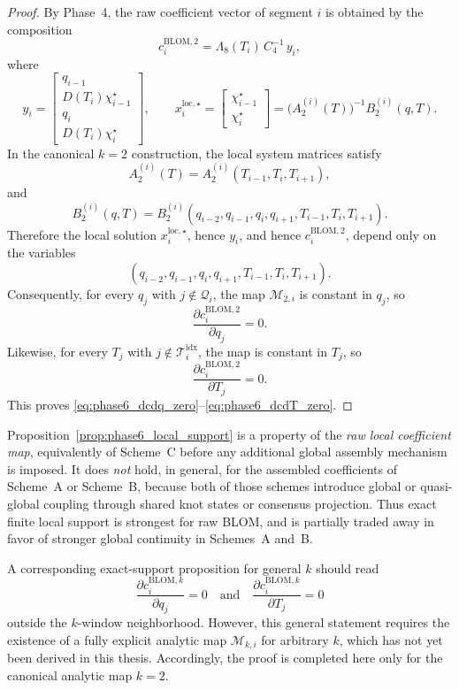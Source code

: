 \begin{proof}
By Phase~4, the raw coefficient vector of segment \(i\) is obtained by the composition
\[
c_i^{\mathrm{BLOM},2}
=
\Lambda_8(T_i)\,C_4^{-1}\,y_i,
\]
where
\[
y_i
=
\begin{bmatrix}
q_{i-1}\\ D(T_i)\chi_{i-1}^\star\\ q_i\\ D(T_i)\chi_i^\star
\end{bmatrix},
\qquad
x_i^{\mathrm{loc},\star}
=
\begin{bmatrix}
\chi_{i-1}^\star\\ \chi_i^\star
\end{bmatrix}
=
\bigl(A_2^{(i)}(T)\bigr)^{-1}B_2^{(i)}(q,T).
\]
In the canonical \(k=2\) construction, the local system matrices satisfy
\[
A_2^{(i)}(T)=A_2^{(i)}(T_{i-1},T_i,T_{i+1}),
\]
and
\[
B_2^{(i)}(q,T)=B_2^{(i)}(q_{i-2},q_{i-1},q_i,q_{i+1},T_{i-1},T_i,T_{i+1}).
\]
Therefore the local solution \(x_i^{\mathrm{loc},\star}\), hence \(y_i\), and hence \(c_i^{\mathrm{BLOM},2}\), depend only on the variables
\[
(q_{i-2},q_{i-1},q_i,q_{i+1},T_{i-1},T_i,T_{i+1}).
\]
Consequently, for every \(q_j\) with \(j\notin\mathcal Q_i\), the map \(\mathcal M_{2,i}\) is constant in \(q_j\), so
\[
\frac{\partial c_i^{\mathrm{BLOM},2}}{\partial q_j}=0.
\]
Likewise, for every \(T_j\) with \(j\notin\mathcal T_i^{\mathrm{idx}}\), the map is constant in \(T_j\), so
\[
\frac{\partial c_i^{\mathrm{BLOM},2}}{\partial T_j}=0.
\]
This proves \eqref{eq:phase6_dcdq_zero}--\eqref{eq:phase6_dcdT_zero}.
\end{proof}

\begin{remark}
\label{rem:phase6_prop1_scope}
Proposition~\ref{prop:phase6_local_support} is a property of the \emph{raw local coefficient map}, equivalently of Scheme~C before any additional global assembly mechanism is imposed.
It does \emph{not} hold, in general, for the assembled coefficients of Scheme~A or Scheme~B, because both of those schemes introduce global or quasi-global coupling through shared knot states or consensus projection.
Thus exact finite local support is strongest for raw BLOM, and is partially traded away in favor of stronger global continuity in Schemes~A and~B.
\end{remark}

\begin{remark}
\label{rem:phase6_prop1_general_k}
A corresponding exact-support proposition for general \(k\) should read
\[
\frac{\partial c_i^{\mathrm{BLOM},k}}{\partial q_j}=0
\quad\text{and}\quad
\frac{\partial c_i^{\mathrm{BLOM},k}}{\partial T_j}=0
\]
outside the \(k\)-window neighborhood.
However, this general statement requires the existence of a fully explicit analytic map \(\mathcal M_{k,i}\) for arbitrary \(k\), which has not yet been derived in this thesis.
Accordingly, the proof is completed here only for the canonical analytic map \(k=2\).
\end{remark}

